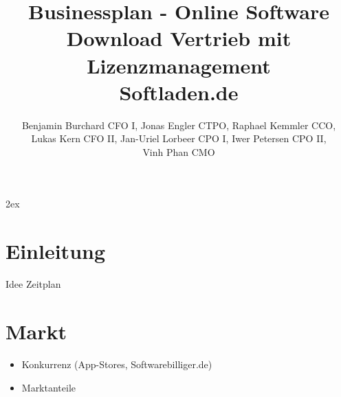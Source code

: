 \documentclass[draft=false
              ,paper=a4
              ,twoside=false
              ,fontsize=11pt
              ,headsepline
              ,BCOR10mm
              ,DIV11
              ]{scrbook}
\begin{document}
\parindent0mm
\parskip2ex

\frontmatter
\title{Businessplan - Online Software Download Vertrieb mit Lizenzmanagement\\Softladen.de}
\author{Benjamin Burchard CFO I, Jonas Engler CTPO, Raphael Kemmler CCO, \\Lukas Kern CFO II, Jan-Uriel Lorbeer CPO I, Iwer Petersen CPO II, \\Vinh Phan CMO}
\maketitle

\tableofcontents
\newpage

\mainmatter
\onehalfspacing

\chapter{Einleitung}
Idee
Zeitplan



\chapter{Markt}
\begin{itemize}
\item Konkurrenz (App-Stores, Softwarebilliger.de)
\item Marktanteile
\end{itemize}




%
%
\end{document}

